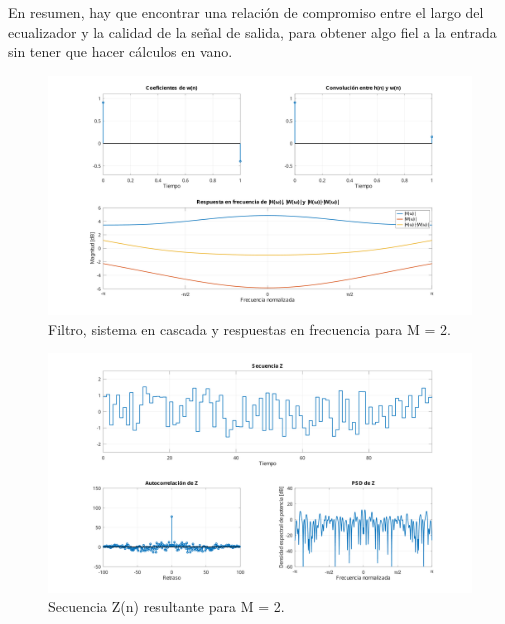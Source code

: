 En resumen, hay que encontrar una relación de compromiso entre el largo del ecualizador y la calidad de la señal de salida, para obtener algo fiel a la entrada sin tener que hacer cálculos en vano.

\begin{figure}[!hbp]
	\centering
	\includegraphics[width=1\linewidth,trim=4cm 0 4cm 0,clip]{img/ej4_2_coef.pdf}
	\caption{Filtro, sistema en cascada y respuestas en frecuencia para M = 2.}
	\label{fig:ej4_2_coef}
\end{figure}

\begin{figure}[!hbp]
	\centering
	\includegraphics[width=1\linewidth,trim=4cm 0 4cm 0,clip]{img/ej4_2_z.pdf}
	\caption{Secuencia Z(n) resultante para M = 2.}
	\label{fig:ej4_2_z}
\end{figure}

